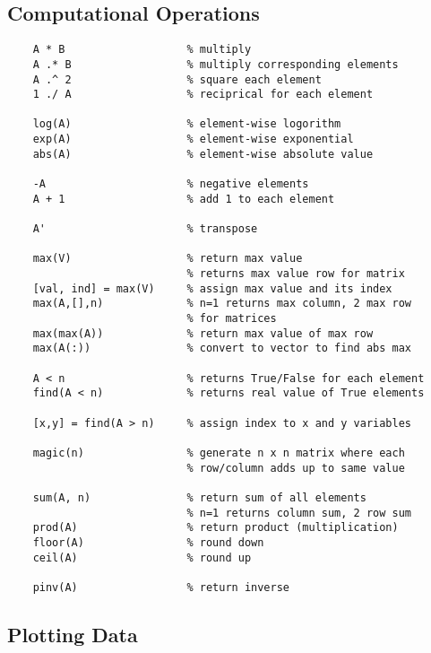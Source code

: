\documentclass[12pt, a4paper]{article}
\begin{document}
  \subsection{Computational Operations}

    \begin{lstlisting}
    A * B                   % multiply 
    A .* B                  % multiply corresponding elements
    A .^ 2                  % square each element
    1 ./ A                  % reciprical for each element

    log(A)                  % element-wise logorithm
    exp(A)                  % element-wise exponential 
    abs(A)                  % element-wise absolute value

    -A                      % negative elements
    A + 1                   % add 1 to each element

    A'                      % transpose

    max(V)                  % return max value
                            % returns max value row for matrix
    [val, ind] = max(V)     % assign max value and its index
    max(A,[],n)             % n=1 returns max column, 2 max row
                            % for matrices
    max(max(A))             % return max value of max row
    max(A(:))               % convert to vector to find abs max

    A < n                   % returns True/False for each element
    find(A < n)             % returns real value of True elements

    [x,y] = find(A > n)     % assign index to x and y variables
    
    magic(n)                % generate n x n matrix where each
                            % row/column adds up to same value

    sum(A, n)               % return sum of all elements
                            % n=1 returns column sum, 2 row sum
    prod(A)                 % return product (multiplication)
    floor(A)                % round down
    ceil(A)                 % round up

    pinv(A)                 % return inverse
    \end{lstlisting}
   
  \newpage

  \subsection{Plotting Data}
\end{document}
